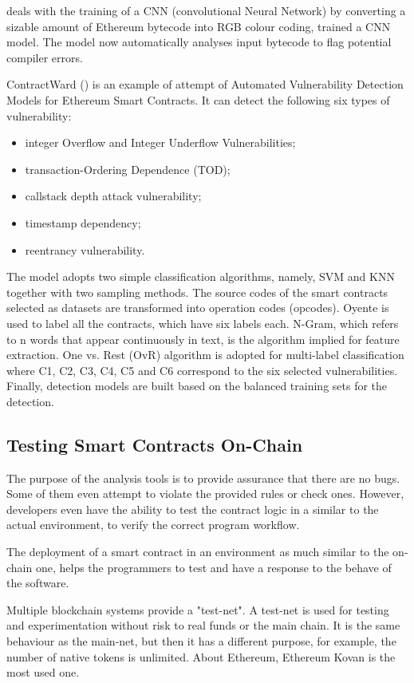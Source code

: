 \documentclass[a4paper,sigconf, language=french,
language=german, language=spanish, language=english]{acmart}
\begin{document}
\cite{CNNML} deals with the training of a CNN (convolutional Neural Network) by converting a sizable amount of Ethereum bytecode into RGB colour coding,  trained a CNN model. The model now automatically analyses input bytecode to flag potential compiler errors. 

ContractWard (\cite{MLtool}) is an example of attempt of Automated Vulnerability Detection Models for Ethereum Smart Contracts. It can detect the following six types of vulnerability: 
\begin{itemize}
    \item integer Overflow and Integer Underflow Vulnerabilities;
    \item transaction-Ordering Dependence (TOD);
    \item callstack depth attack vulnerability;
    \item timestamp dependency;
    \item reentrancy vulnerability.
\end{itemize}

The model adopts two simple classification algorithms, namely, SVM and KNN together with two sampling methods.
The source codes of the smart contracts selected as datasets are transformed into operation codes (opcodes). Oyente is used to label all the contracts, which have six labels each.  N-Gram, which refers to n words that appear
continuously in text, is the algorithm implied for feature extraction.
One vs. Rest (OvR) algorithm is adopted for multi-label classification where
C1, C2, C3, C4, C5 and C6 correspond to the six selected vulnerabilities. 
Finally, detection models are built based on the balanced
training sets for the detection.

\subsection{Testing Smart Contracts On-Chain}
The purpose of the analysis tools is to provide assurance that there are no bugs. Some of them even attempt to violate the provided rules or check ones. However, developers even have the ability to test the contract logic in a similar to the actual environment, to verify the correct program workflow.

The deployment of a smart contract in an environment as much similar to the on-chain one, helps the programmers to test and have a response to the behave of the software.

Multiple blockchain systems provide a "test-net". A test-net is used for testing and experimentation without risk to real funds or the main chain. It is the same behaviour as the main-net, but then it has a different purpose, for example, the number of native tokens is unlimited.
About Ethereum, Ethereum Kovan is the most used one. 
\end{document}

